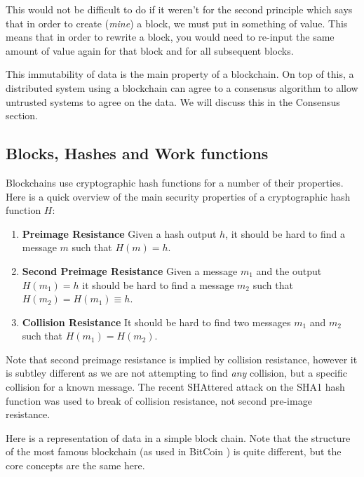 
This would not be difficult to do if it weren't for the second principle which says that in order to create (\emph{mine}) a block, we must put in something of value. This means that in order to rewrite a block, you would need to re-input the same amount of value again for that block and for all subsequent blocks.

This immutability of data is the main property of a blockchain. On top of this, a distributed system using a blockchain can agree to a consensus algorithm to allow untrusted systems to agree on the data. We will discuss this in the Consensus section.

\subsection{Blocks, Hashes and Work functions}
\label{ch:blockchain:structure:basics}

Blockchains use cryptographic hash functions for a number of their properties. Here is a quick overview of the main security properties of a cryptographic hash function $H$:

\begin{enumerate}
    \item \textbf{Preimage Resistance} Given a hash output $h$, it should be hard to find a message $m$ such that $H(m) = h$.
    \item \textbf{Second Preimage Resistance} Given a message $m_1$ and the output $H(m_1) = h$ it should be hard to find a message $m_2$ such that $H(m_2) = H(m_1) \equiv h$.
    \item \textbf{Collision Resistance} It should be hard to find two messages $m_1$ and $m_2$ such that $H(m_1) = H(m_2)$.
\end{enumerate}

Note that second preimage resistance is implied by collision resistance, however it is subtley different as we are not attempting to find \emph{any} collision, but a specific collision for a known message. The recent SHAttered \cite{katz_first_2017} attack on the SHA1 hash function was used to break of collision resistance, not second pre-image resistance.

Here is a representation of data in a simple block chain. Note that the structure of the most famous blockchain (as used in BitCoin ) is quite different, but the core concepts are the same here.


